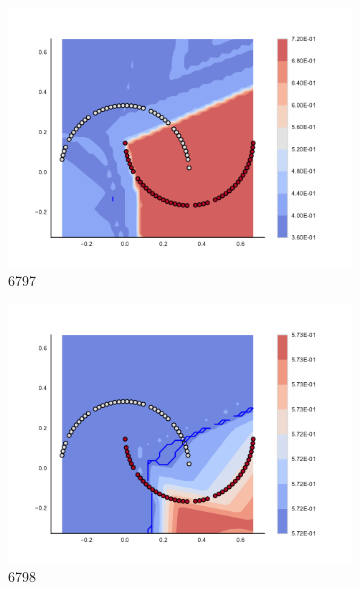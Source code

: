 \begin{figure}[h]
\begin{subfigure}[b]{0.09\textwidth}
    \includegraphics[clip, trim=2.35cm 1.75cm 4.5cm 0cm,width=\textwidth]{img/convergence/6797.pdf}
    \caption{6797}
    \label{fig:convergence_6797}
\end{subfigure}
%
\begin{subfigure}[b]{0.09\textwidth}
    \includegraphics[clip, trim=2.35cm 1.75cm 4.5cm 0cm,width=\textwidth]{img/convergence/6798.pdf}
    \caption{6798}
    \label{fig:convergence_6798}
\end{subfigure}
%
\begin{subfigure}[b]{0.09\textwidth}

\end{subfigure}
\end{figure}

